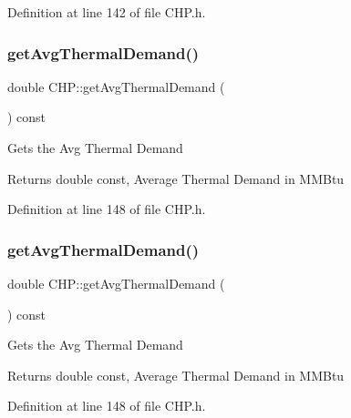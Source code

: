Definition at line 142 of file C\+H\+P.\+h.

\mbox{\label{class_c_h_p_a5f8975488324e4aa3517c9e01334f4bf}} 
\subsubsection{\texorpdfstring{get\+Avg\+Thermal\+Demand()}{getAvgThermalDemand()}\hspace{0.1cm}{\footnotesize\ttfamily [1/3]}}
{\footnotesize\ttfamily double C\+H\+P\+::get\+Avg\+Thermal\+Demand (\begin{DoxyParamCaption}{ }\end{DoxyParamCaption}) const\hspace{0.3cm}{\ttfamily [inline]}}

Gets the Avg Thermal Demand

\begin{DoxyReturn}{Returns}
double const, Average Thermal Demand in M\+M\+Btu 
\end{DoxyReturn}


Definition at line 148 of file C\+H\+P.\+h.

\mbox{\label{class_c_h_p_a5f8975488324e4aa3517c9e01334f4bf}} 
\subsubsection{\texorpdfstring{get\+Avg\+Thermal\+Demand()}{getAvgThermalDemand()}\hspace{0.1cm}{\footnotesize\ttfamily [2/3]}}
{\footnotesize\ttfamily double C\+H\+P\+::get\+Avg\+Thermal\+Demand (\begin{DoxyParamCaption}{ }\end{DoxyParamCaption}) const\hspace{0.3cm}{\ttfamily [inline]}}

Gets the Avg Thermal Demand

\begin{DoxyReturn}{Returns}
double const, Average Thermal Demand in M\+M\+Btu 
\end{DoxyReturn}


Definition at line 148 of file C\+H\+P.\+h.

